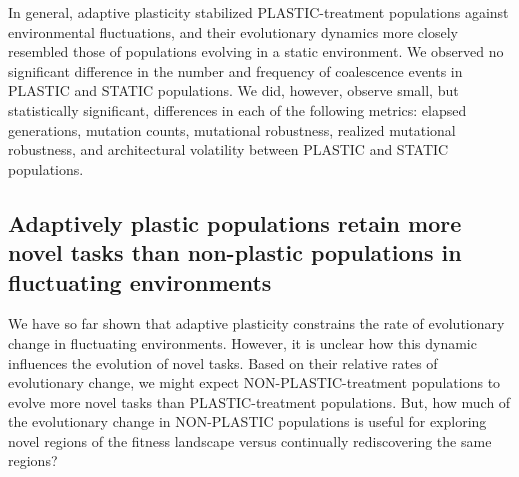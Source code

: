 In general, adaptive plasticity stabilized PLASTIC-treatment populations against environmental fluctuations, and their evolutionary dynamics more closely resembled those of populations evolving in a static environment.
We observed no significant difference in the number and frequency of coalescence events in PLASTIC and STATIC populations.
We did, however, observe small, but statistically significant, differences in each of the following metrics: elapsed generations, mutation counts, mutational robustness, realized mutational robustness, and architectural volatility between PLASTIC and STATIC populations. %

\vspace{0.5cm}
\subsection{Adaptively plastic populations retain more novel tasks than non-plastic populations in fluctuating environments}





We have so far shown that adaptive plasticity constrains the rate of evolutionary change in fluctuating environments.
However, it is unclear how this dynamic influences the evolution of novel tasks.
Based on their relative rates of evolutionary change, we might expect NON-PLASTIC-treatment populations to evolve more novel tasks than PLASTIC-treatment populations.
But, how much of the evolutionary change in NON-PLASTIC populations is useful for exploring novel regions of the fitness landscape versus continually rediscovering the same regions?

